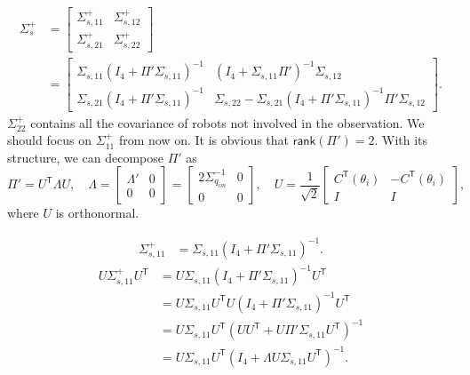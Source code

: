 \documentclass[xcolor=x11names]{article}
\DeclareMathOperator\T{\mathsf{T}}
\begin{document}
   \begin{align*}
      \Sigma^{+}_s 
          &= 
          \begin{bmatrix} 
            \Sigma_{s,11}^+  & \Sigma_{s,12}^+\\
            \Sigma_{s,21}^+  & \Sigma_{s,22}^+
          \end{bmatrix}          \\
          &=
          \begin{bmatrix} 
            \Sigma_{s,11}\left(I_4 + \Pi' \Sigma_{s,11} \right)^{-1} &  \left(I_4 + \Sigma_{s,11} \Pi' \right)^{-1}\Sigma_{s,12} \\
            \Sigma_{s,21}\left(I_4 + \Pi' \Sigma_{s,11} \right)^{-1}  & \Sigma_{s,22}  -\Sigma_{s,21}\left(I_4 + \Pi' \Sigma_{s,11} \right)^{-1} \Pi' \Sigma_{s,12}
          \end{bmatrix}.
   \end{align*}     
   $\Sigma_{22}^+$ contains all the covariance of robots not involved in the observation. We should focus on $\Sigma^+_{11}$ from now on.
    It is obvious that $\mathsf{rank}(\Pi')=2$. With its structure, we can decompose $\Pi'$ as
    \begin{equation}
       \Pi' = U^{\T} \Lambda U, \quad \Lambda=         
       \begin{bmatrix} 
            \Lambda'  & 0\\
             0 & 0
         \end{bmatrix}
         =
         \begin{bmatrix} 
            2 \Sigma_{q_{im}}^{-1}  & 0\\
             0 & 0
         \end{bmatrix}, 
         \quad U = \frac{1}{\sqrt{2}}
       \begin{bmatrix} 
            C^{\T}(\theta_i) & -C^{\T}(\theta_i) \\
             I & I
         \end{bmatrix},
    \end{equation}
    where $U$ is orthonormal.
    
    
   \begin{align*}
      \Sigma_{s,11}^+
          &= \Sigma_{s,11}\left(I_4 + \Pi' \Sigma_{s,11} \right)^{-1}.
   \end{align*}
   \begin{align*}
          U \Sigma_{s,11}^+ U^{\T}
          &= U \Sigma_{s,11}\left(I_4 + \Pi' \Sigma_{s,11} \right)^{-1} U^{\T} \\
          &= U \Sigma_{s,11} U^{\T} U \left(I_4 + \Pi' \Sigma_{s,11} \right)^{-1} U^{\T} \\
          &= U \Sigma_{s,11} U^{\T} \left(U U^{\T}  + U \Pi' \Sigma_{s,11} U^{\T} \right)^{-1}\\
          &= U \Sigma_{s,11} U^{\T} \left(I_4  + \Lambda U \Sigma_{s,11} U^{\T} \right)^{-1}.
   \end{align*}      
    
\end{document}

